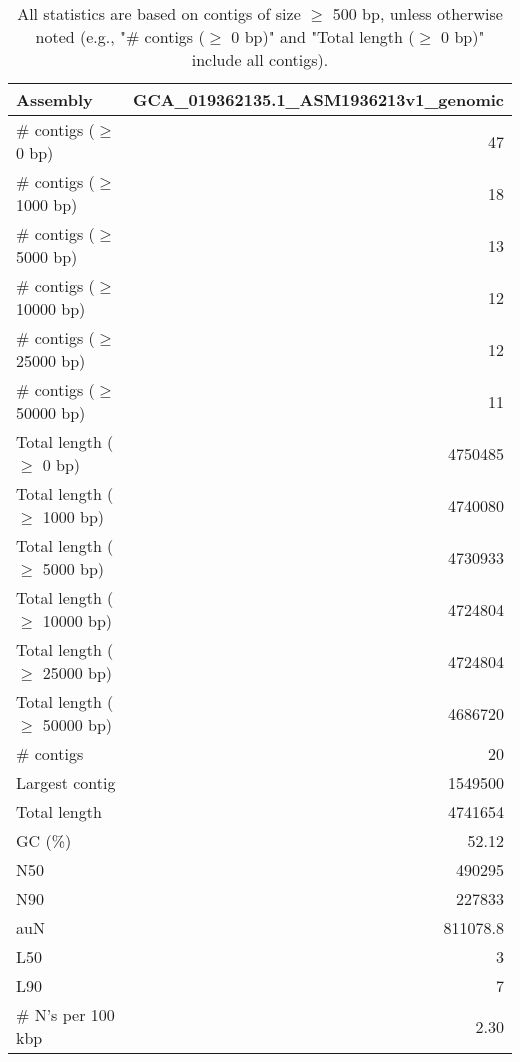 \documentclass[12pt,a4paper]{article}
\begin{document}
\begin{table}[ht]
\begin{center}
\caption{All statistics are based on contigs of size $\geq$ 500 bp, unless otherwise noted (e.g., "\# contigs ($\geq$ 0 bp)" and "Total length ($\geq$ 0 bp)" include all contigs).}
\begin{tabular}{|l*{1}{|r}|}
\hline
Assembly & GCA\_019362135.1\_ASM1936213v1\_genomic \\ \hline
\# contigs ($\geq$ 0 bp) & 47 \\ \hline
\# contigs ($\geq$ 1000 bp) & 18 \\ \hline
\# contigs ($\geq$ 5000 bp) & 13 \\ \hline
\# contigs ($\geq$ 10000 bp) & 12 \\ \hline
\# contigs ($\geq$ 25000 bp) & 12 \\ \hline
\# contigs ($\geq$ 50000 bp) & 11 \\ \hline
Total length ($\geq$ 0 bp) & 4750485 \\ \hline
Total length ($\geq$ 1000 bp) & 4740080 \\ \hline
Total length ($\geq$ 5000 bp) & 4730933 \\ \hline
Total length ($\geq$ 10000 bp) & 4724804 \\ \hline
Total length ($\geq$ 25000 bp) & 4724804 \\ \hline
Total length ($\geq$ 50000 bp) & 4686720 \\ \hline
\# contigs & 20 \\ \hline
Largest contig & 1549500 \\ \hline
Total length & 4741654 \\ \hline
GC (\%) & 52.12 \\ \hline
N50 & 490295 \\ \hline
N90 & 227833 \\ \hline
auN & 811078.8 \\ \hline
L50 & 3 \\ \hline
L90 & 7 \\ \hline
\# N's per 100 kbp & 2.30 \\ \hline
\end{tabular}
\end{center}
\end{table}
\end{document}
